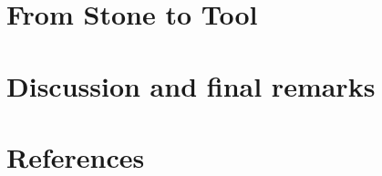 \documentclass[
  a4paper,
  DIV=11,
  numbers=noendperiod]{scrreprt}
\begin{document}

\chapter{From Stone to Tool}\label{from-stone-to-tool}


\chapter{Discussion and final
remarks}\label{discussion-and-final-remarks}


\chapter*{References}\label{references}

\end{document}
